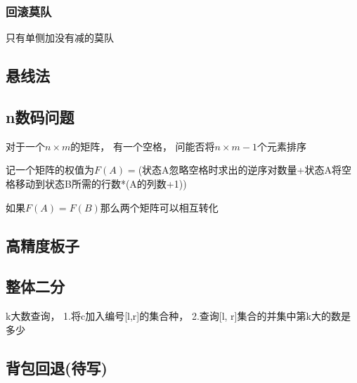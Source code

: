 \documentclass[UTF8]{article}
\newcommand{\cppcode}[1]{
    
}
\begin{document}
\subsubsection{回滚莫队}
只有单侧加没有减的莫队
\cppcode{Mo.cpp}

\subsection{悬线法}
\cppcode{Line.cpp}

\subsection{n数码问题}
对于一个$n\times m$的矩阵， 有一个空格， 问能否将$n\times m - 1$个元素排序

记一个矩阵的权值为$F(A)=$(状态A忽略空格时求出的逆序对数量+状态A将空格移动到状态B所需的行数*(A的列数+1))

如果$F(A) = F(B)$那么两个矩阵可以相互转化

\subsection{高精度板子}
\cppcode{BigInt.cpp}

\subsection{整体二分}
k大数查询， 1.将c加入编号[l,r]的集合种， 2.查询[l, r]集合的并集中第k大的数是多少
\cppcode{ztef.cpp}

\subsection{背包回退(待写)}
\end{document}
